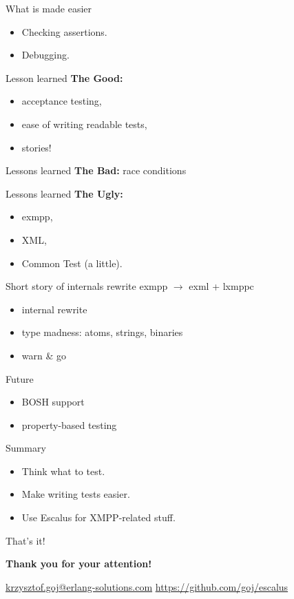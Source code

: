 \documentclass[17pt]{beamer}
\begin{document}
\begin{frame}{What is made easier}
\begin{itemize}
\item Checking assertions.
\item Debugging.
\end{itemize}
\end{frame}

\begin{frame}{Lesson learned}
\textbf{The Good:}
\begin{itemize}
\item acceptance testing,
\item ease of writing readable tests,
\item stories!
\end{itemize}
\end{frame}

\begin{frame}{Lessons learned}
\textbf{The Bad:} race conditions
\end{frame}

\begin{frame}{Lessons learned}
\textbf{The Ugly:}
\begin{itemize}
\item exmpp,
\item XML,
\item Common Test (a little).
\end{itemize}
\end{frame}

\begin{frame}{Short story of internals rewrite}
exmpp $\rightarrow$ exml + lxmppc
\begin{itemize}
\item internal rewrite
\item type madness: atoms, strings, binaries
\item warn \& go
\end{itemize}
\end{frame}

\begin{frame}{Future}
\begin{itemize}
\item BOSH support
\item property-based testing
\end{itemize}
\end{frame}

\begin{frame}{Summary}
\begin{itemize}
\item Think what to test.
\item Make writing tests easier.
\item Use Escalus for XMPP-related stuff.
\end{itemize}
\end{frame}

\begin{frame}{That's it!}
\begin{center}
\vspace{3em}

\textbf{\large Thank you for your attention!}

\vspace{2em}

\small
\href{mailto:krzysztof.goj@erlang-solutions.com}{krzysztof.goj@erlang-solutions.com}
\url{https://github.com/goj/escalus}
\end{center}
\end{frame}
\end{document}
